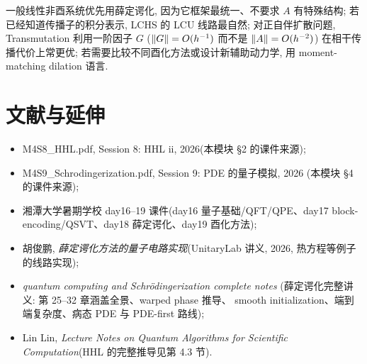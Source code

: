 \documentclass[utf8]{article} %
\numberwithin{equation}{section}   %
\newtheorem{Note}{\hskip 2em {\color{red} 注}}[subsection]
\begin{document}
\begin{Note}[如何选择]
    一般线性非酉系统优先用薛定谔化, 因为它框架最统一、不要求 $A$ 有特殊结构;
    若已经知道传播子的积分表示, LCHS 的 LCU 线路最自然;
    对正自伴扩散问题, Transmutation 利用一阶因子 $G$
    ($\norm{G} = O(h^{-1})$ 而不是 $\norm{A} = O(h^{-2})$)
    在相干传播代价上常更优;
    若需要比较不同酉化方法或设计新辅助动力学, 用 moment-matching dilation 语言.
\end{Note}

\section{文献与延伸}

\begin{Note}[本模块参考的讲义]
    \begin{itemize}
        \item M4S8\_HHL.pdf, Session 8: HHL ii, 2026(本模块 §2 的课件来源);
        \item M4S9\_Schrodingerization.pdf, Session 9: PDE 的量子模拟, 2026
        (本模块 §4 的课件来源);
        \item 湘潭大学暑期学校 day16--19 课件(day16 量子基础/QFT/QPE、day17
        block-encoding/QSVT、day18 薛定谔化、day19 酉化方法);
        \item 胡俊鹏, \emph{薛定谔化方法的量子电路实现}(UnitaryLab 讲义, 2026,
        热方程等例子的线路实现);
        \item \emph{quantum computing and Schrödingerization complete notes}
        (薛定谔化完整讲义: 第 25--32 章涵盖全景、warped phase 推导、
        smooth initialization、端到端复杂度、病态 PDE 与 PDE-first 路线);
        \item Lin Lin, \emph{Lecture Notes on Quantum Algorithms for Scientific
        Computation}(HHL 的完整推导见第 4.3 节).
    \end{itemize}
\end{Note}
\end{document}
